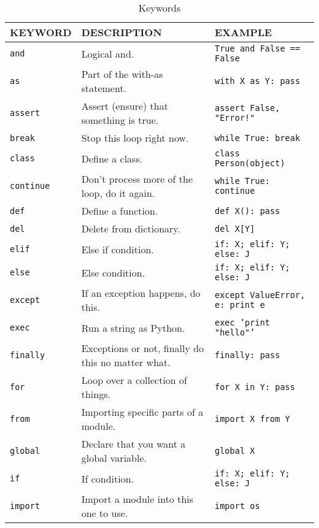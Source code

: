 \def\mytitle{Summary}
    \def\myauthor{Stefan Peng}
	
	\begin{table}[htbp]
      \begin{minipage}{\linewidth}
      \setlength{\tymax}{0.5\linewidth}
      \centering
      \small
    \caption{Keywords}
    \label{keywords}
      \begin{tabulary}{\textwidth}{@{}LLL@{}} \toprule
    KEYWORD&DESCRIPTION&EXAMPLE\\
      \midrule
    \texttt{and}&Logical and.&\texttt{True and False == False}\\
    \texttt{as}&Part of the with-as statement.&\texttt{with X as Y: pass}\\
    \texttt{assert}&Assert (ensure) that something is true.&\texttt{assert False, "Error!"}\\
    \texttt{break}&Stop this loop right now.&\texttt{while True: break}\\
    \texttt{class}&Define a class.&\texttt{class Person(object)}\\
    \texttt{continue}&Don't process more of the loop, do it again.&\texttt{while True: continue}\\
    \texttt{def}&Define a function.&\texttt{def X(): pass}\\
    \texttt{del}&Delete from dictionary.&\texttt{del X[Y]}\\
    \texttt{elif}&Else if condition.&\texttt{if: X; elif: Y; else: J}\\
    \texttt{else}&Else condition.&\texttt{if: X; elif: Y; else: J}\\
    \texttt{except}&If an exception happens, do this.&\texttt{except ValueError, e: print e}\\
    \texttt{exec}&Run a string as Python.&\texttt{exec 'print "hello"'}\\
    \texttt{finally}&Exceptions or not, finally do this no matter what.&\texttt{finally: pass}\\
    \texttt{for}&Loop over a collection of things.&\texttt{for X in Y: pass}\\
    \texttt{from}&Importing specific parts of a module.&\texttt{import X from Y}\\
    \texttt{global}&Declare that you want a global variable.&\texttt{global X}\\
    \texttt{if}&If condition.&\texttt{if: X; elif: Y; else: J}\\
    \texttt{import}&Import a module into this one to use.&\texttt{import os}\\

\end{tabulary}
\end{minipage}
\end{table}
